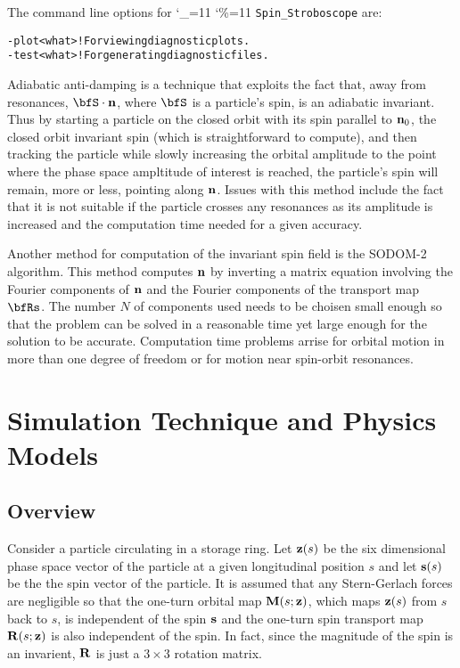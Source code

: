 \documentclass[11pt,openany]{report}
\newcommand{\Bf}[1]{{\bf #1}}
\newcommand{\bfn}{{\Bf n}}
\newcommand{\bfs}{{\Bf s}}
\newcommand{\bfz}{{\Bf z}}
\newcommand{\bfM}{{\Bf M}}
\newcommand{\bfR}{{\Bf R}}
\newcommand\dottcmd[1]{\texttt{#1}\endgroup}
\newcommand{\vn}{\begingroup\catcode`\_=11 \catcode`\%=11 \dottcmd}
\newcommand{\sss}{\vn{Spin_Stroboscope}\xspace}
\newlength{\ExBeg}
\newlength{\ExEnd}
\newenvironment{example}
  {\vspace{\ExBeg} \begin{alltt}}
  {\end{alltt} \vspace{\ExEnd}}
\begin{document}
The command line options for \sss are:
\begin{example}
  -plot <what>  ! For viewing diagnostic plots.
  -test <what>  ! For generating diagnostic files.
\end{example}


Adiabatic
anti-damping is a technique that exploits the fact that, away from resonances, $\bfS \cdot \bfn$,
where $\bfS$ is a particle's spin, is an adiabatic invariant\cite{b:hoff.book}. Thus by starting a
particle on the closed orbit with its spin parallel to $\bfn_0$, the closed orbit invariant spin
(which is straightforward to compute), and then tracking the particle while slowly increasing the
orbital amplitude to the point where the phase space ampltitude of interest is reached, the
particle's spin will remain, more or less, pointing along $\bfn$. Issues with this method include the
fact that it is not suitable if the particle crosses any resonances as its amplitude is increased
and the computation time needed for a given accuracy.

Another method for computation of the invariant spin field is the SODOM-2 algorithm\cite{b:sodom2}.
This method computes $\bfn$ by inverting a matrix equation involving the Fourier components of
$\bfn$ and the Fourier components of the transport map $\bfRs$.  The number $N$ of components used
needs to be choisen small enough so that the problem can be solved in a reasonable time yet large
enough for the solution to be accurate. Computation time problems arrise for orbital motion in more
than one degree of freedom or for motion near spin-orbit resonances\cite{b:hoff.book}.



\chapter{Simulation Technique and Physics Models}
\section{Overview} 

Consider a particle circulating in a storage ring. Let $\bfz(s)$ be the six dimensional
phase space vector of the particle at a given longitudinal position $s$ and let $\bfs(s)$ be the the
spin vector of the particle. It is assumed that any Stern-Gerlach forces are negligible so that the
one-turn orbital map $\bfM(s;\bfz)$, which maps $\bfz(s)$ from $s$ back to $s$, is independent of
the spin $\bfs$ and the one-turn spin transport map $\bfR(s;\bfz)$ is also independent of the spin.
In fact, since the magnitude of the spin is an invarient, $\bfR$ is just a $3 \times 3$ rotation
matrix.
\end{document}

